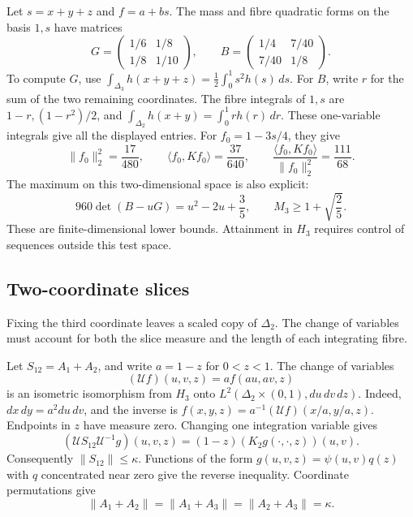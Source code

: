 \documentclass[11pt]{article}
\newcommand{\D}{\Delta}
\newcommand{\ip}[2]{\langle #1,#2\rangle}
\newcommand{\norm}[1]{\lVert #1\rVert}
\begin{document}
\begin{example}\label{ex:linear-test}
Let $s=x+y+z$ and $f=a+bs$.
The mass and fibre quadratic forms on the basis $1,s$ have matrices
\[
 G=\begin{pmatrix}1/6&1/8\\1/8&1/10\end{pmatrix},\qquad
 B=\begin{pmatrix}1/4&7/40\\7/40&1/8\end{pmatrix}.
\]
To compute $G$, use
$\int_{\D_3}h(x+y+z)=\tfrac12\int_0^1s^2h(s)\,ds$.
For $B$, write $r$ for the sum of the two remaining coordinates.
The fibre integrals of $1,s$ are $1-r,(1-r^2)/2$, and
$\int_{\D_2}h(x+y)=\int_0^1r h(r)\,dr$.
These one-variable integrals give all the displayed entries.
For $f_0=1-3s/4$, they give
\begin{equation}\label{eq:linear-rayleigh}
 \norm{f_0}_2^2=\frac{17}{480},\qquad
 \ip{f_0}{Kf_0}=\frac{37}{640},\qquad
 \frac{\ip{f_0}{Kf_0}}{\norm{f_0}_2^2}=\frac{111}{68}.
\end{equation}
The maximum on this two-dimensional space is also explicit:
\[
 960\det(B-uG)=u^2-2u+\frac35,
 \qquad M_3\geq1+\sqrt{\frac25}.
\]
These are finite-dimensional lower bounds.  Attainment in $H_3$ requires
control of sequences outside this test space.
\end{example}

\subsection{Two-coordinate slices}

Fixing the third coordinate leaves a scaled copy of $\Delta_2$.
The change of variables must account for both the slice measure and the
length of each integrating fibre.

Let $S_{12}=A_1+A_2$, and write $a=1-z$ for $0<z<1$.
The change of variables
\begin{equation}\label{eq:slice-unitary}
 (\mathcal Uf)(u,v,z)=a f(au,av,z)
\end{equation}
is an isometric isomorphism from $H_3$ onto
$L^2(\D_2\times(0,1),du\,dv\,dz)$.
Indeed, $dx\,dy=a^2du\,dv$, and the inverse is
$f(x,y,z)=a^{-1}(\mathcal Uf)(x/a,y/a,z)$.
Endpoints in $z$ have measure zero.
Changing one integration variable gives
\begin{equation}\label{eq:pair-decomposition}
           (\mathcal U S_{12}\mathcal U^{-1}g)(u,v,z)
                         =(1-z)(K_2g(\cdot,\cdot,z))(u,v).
\end{equation}
Consequently $\norm{S_{12}}\leq\kappa$.
Functions of the form $g(u,v,z)=\psi(u,v)q(z)$ with $q$ concentrated
near zero give the reverse inequality.
Coordinate permutations give
\begin{equation}\label{eq:pair-norm}
                 \norm{A_1+A_2}=\norm{A_1+A_3}
                       =\norm{A_2+A_3}=\kappa.
\end{equation}
\end{document}
